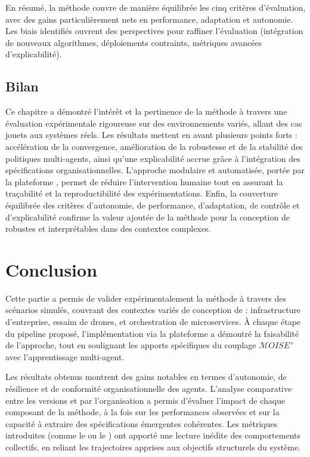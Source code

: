 \medskip
En résumé, la méthode  couvre de manière équilibrée les cinq critères d'évaluation, avec des gains particulièrement nets en performance, adaptation et autonomie. Les biais identifiés ouvrent des perspectives pour raffiner l'évaluation (intégration de nouveaux algorithmes, déploiements contraints, métriques avancées d'explicabilité).

\section{Bilan}

Ce chapitre a démontré l'intérêt et la pertinence de la méthode  à travers une évaluation expérimentale rigoureuse sur des environnements variés, allant des cas jouets aux systèmes réels. Les résultats mettent en avant plusieurs points forts : accélération de la convergence, amélioration de la robustesse et de la stabilité des politiques multi-agents, ainsi qu'une explicabilité accrue grâce à l'intégration des spécifications organisationnelles. L'approche modulaire et automatisée, portée par la plateforme , permet de réduire l'intervention humaine tout en assurant la traçabilité et la reproductibilité des expérimentations. Enfin, la couverture équilibrée des critères d'autonomie, de performance, d'adaptation, de contrôle et d'explicabilité confirme la valeur ajoutée de la méthode pour la conception de  robustes et interprétables dans des contextes complexes.

\clearpage
\thispagestyle{empty}
\null
\newpage


\chapter*{Conclusion}

Cette partie a permis de valider expérimentalement la méthode  à travers des scénarios simulés, couvrant des contextes variés de conception de  : infrastructure d'entreprise, essaim de drones, et orchestration de microservices. À chaque étape du pipeline proposé, l'implémentation via la plateforme  a démontré la faisabilité de l'approche, tout en soulignant les apports spécifiques du couplage $\mathcal{M}OISE^+$ avec l'apprentissage multi-agent.

Les résultats obtenus montrent des gains notables en termes d'autonomie, de résilience et de conformité organisationnelle des agents. L'analyse comparative entre les versions  et  par l'organisation a permis d'évaluer l'impact de chaque composant de la méthode, à la fois sur les performances observées et sur la capacité à extraire des spécifications émergentes cohérentes. Les métriques introduites (comme le  ou le ) ont apporté une lecture inédite des comportements collectifs, en reliant les trajectoires apprises aux objectifs structurels du système.


